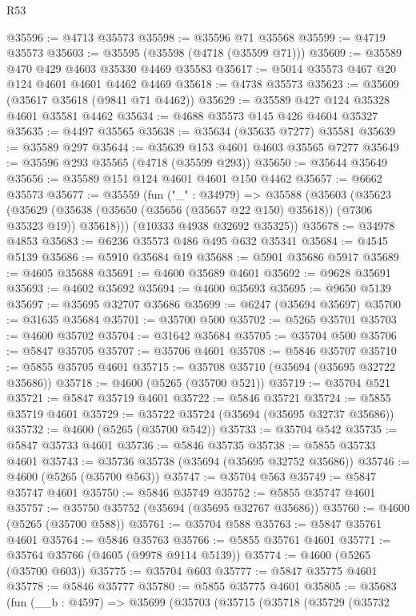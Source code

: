\begin{lexlean}{R53}
\begin{coremodule}
@35596 := @4713 @35573
@35598 := @35596 @71 @35568
@35599 := @4719 @35573
@35603 := @35595 (@35598 (@4718 (@35599 @71)))
@35609 := @35589 @470 @429 @4603 @35330 @4469 @35583
@35617 := @5014 @35573 @467 @20 @124 @4601 @4601 @4462 @4469
@35618 := @4738 @35573
@35623 := @35609 (@35617 @35618 (@9841 @71 @4462))
@35629 := @35589 @427 @124 @35328 @4601 @35581 @4462
@35634 := @4688 @35573 @145 @426 @4604 @35327
@35635 := @4497 @35565
@35638 := @35634 (@35635 @7277) @35581
@35639 := @35589 @297
@35644 := @35639 @153 @4601 @4603 @35565 @7277
@35649 := @35596 @293 @35565 (@4718 (@35599 @293))
@35650 := @35644 @35649
@35656 := @35589 @151 @124 @4601 @4601 @150 @4462
@35657 := @6662 @35573
@35677 := @35559
    (fun ("_" : @34979) =>
    @35588
      (@35603
        (@35623
          (@35629 (@35638 (@35650 (@35656 (@35657 @22 @150) @35618)) (@7306 @35323 @19)) @35618)))
      (@10333 @4938 @32692 @35325))
@35678 := @34978 @4853
@35683 := @6236 @35573 @486 @495 @632 @35341
@35684 := @4545 @5139
@35686 := @5910 @35684 @19
@35688 := @5901 @35686 @5917
@35689 := @4605 @35688
@35691 := @4600 @35689 @4601
@35692 := @9628 @35691
@35693 := @4602 @35692
@35694 := @4600 @35693
@35695 := @9650 @5139
@35697 := @35695 @32707 @35686
@35699 := @6247 (@35694 @35697)
@35700 := @31635 @35684
@35701 := @35700 @500
@35702 := @5265 @35701
@35703 := @4600 @35702
@35704 := @31642 @35684
@35705 := @35704 @500
@35706 := @5847 @35705
@35707 := @35706 @4601
@35708 := @5846 @35707
@35710 := @5855 @35705 @4601
@35715 := @35708 @35710 (@35694 (@35695 @32722 @35686))
@35718 := @4600 (@5265 (@35700 @521))
@35719 := @35704 @521
@35721 := @5847 @35719 @4601
@35722 := @5846 @35721
@35724 := @5855 @35719 @4601
@35729 := @35722 @35724 (@35694 (@35695 @32737 @35686))
@35732 := @4600 (@5265 (@35700 @542))
@35733 := @35704 @542
@35735 := @5847 @35733 @4601
@35736 := @5846 @35735
@35738 := @5855 @35733 @4601
@35743 := @35736 @35738 (@35694 (@35695 @32752 @35686))
@35746 := @4600 (@5265 (@35700 @563))
@35747 := @35704 @563
@35749 := @5847 @35747 @4601
@35750 := @5846 @35749
@35752 := @5855 @35747 @4601
@35757 := @35750 @35752 (@35694 (@35695 @32767 @35686))
@35760 := @4600 (@5265 (@35700 @588))
@35761 := @35704 @588
@35763 := @5847 @35761 @4601
@35764 := @5846 @35763
@35766 := @5855 @35761 @4601
@35771 := @35764 @35766 (@4605 (@9978 @9114 @5139))
@35774 := @4600 (@5265 (@35700 @603))
@35775 := @35704 @603
@35777 := @5847 @35775 @4601
@35778 := @5846 @35777
@35780 := @5855 @35775 @4601
@35805 := @35683
    (fun (__b : @4597) =>
    @35699
      (@35703
        (@35715
          (@35718
            (@35729
              (@35732

\end{coremodule}
\end{lexlean}
